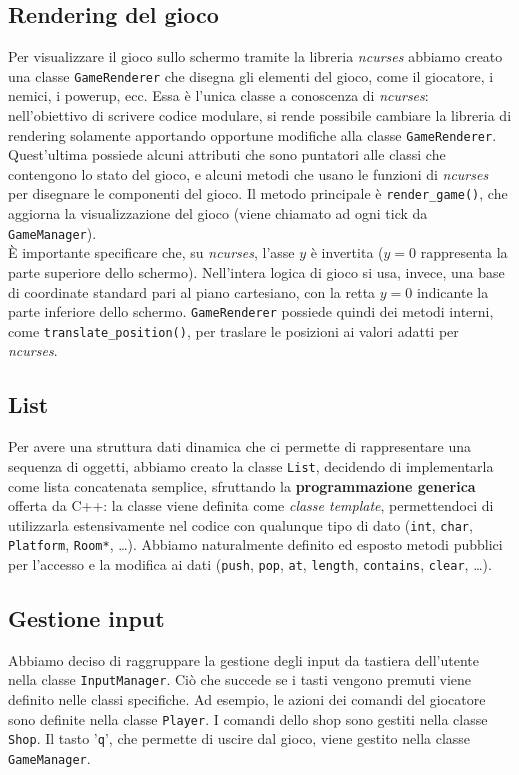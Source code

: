 \documentclass[a4paper,12pt]{article}
\begin{document}
\subsection{Rendering del gioco}

Per visualizzare il gioco sullo schermo tramite la libreria \textit{ncurses} abbiamo creato una classe \texttt{GameRenderer} che disegna gli elementi del gioco, come il giocatore, i nemici, i powerup, ecc. Essa è l'unica classe a conoscenza di \textit{ncurses}: nell'obiettivo di scrivere codice modulare, si rende possibile cambiare la libreria di rendering solamente apportando opportune modifiche alla classe \texttt{GameRenderer}. Quest'ultima possiede alcuni attributi che sono puntatori alle classi che contengono lo stato del gioco, e alcuni metodi che usano le funzioni di \textit{ncurses} per disegnare le componenti del gioco. Il metodo principale è \texttt{render\_game()}, che aggiorna la visualizzazione del gioco (viene chiamato ad ogni tick da \texttt{GameManager}). \\

È importante specificare che, su \textit{ncurses}, l'asse $y$ è invertita ($y = 0$ rappresenta la parte superiore dello schermo). Nell'intera logica di gioco si usa, invece, una base di coordinate standard pari al piano cartesiano, con la retta $y = 0$ indicante la parte inferiore dello schermo. \texttt{GameRenderer} possiede quindi dei metodi interni, come \texttt{translate\_position()}, per traslare le posizioni ai valori adatti per \textit{ncurses}.

\subsection{List}
Per avere una struttura dati dinamica che ci permette di rappresentare una sequenza di oggetti, abbiamo creato la classe \texttt{List}, decidendo di implementarla come lista concatenata semplice, sfruttando la \textbf{programmazione generica} offerta da C++: la classe viene definita come \textit{classe template}, permettendoci di utilizzarla estensivamente nel codice con qualunque tipo di dato (\texttt{int}, \texttt{char}, \texttt{Platform}, \texttt{Room*}, …).
Abbiamo naturalmente definito ed esposto metodi pubblici per l'accesso e la modifica ai dati (\texttt{push}, \texttt{pop}, \texttt{at}, \texttt{length}, \texttt{contains}, \texttt{clear}, …).

\subsection{Gestione input}
Abbiamo deciso di raggruppare la gestione degli input da tastiera dell'utente nella classe \texttt{InputManager}. Ciò che succede se i tasti vengono premuti viene definito nelle classi specifiche. Ad esempio, le azioni dei comandi del giocatore sono definite nella classe \texttt{Player}. I comandi dello shop sono gestiti nella classe \texttt{Shop}. Il tasto '\texttt{q}', che permette di uscire dal gioco, viene gestito nella classe \texttt{GameManager}. 
\end{document}
